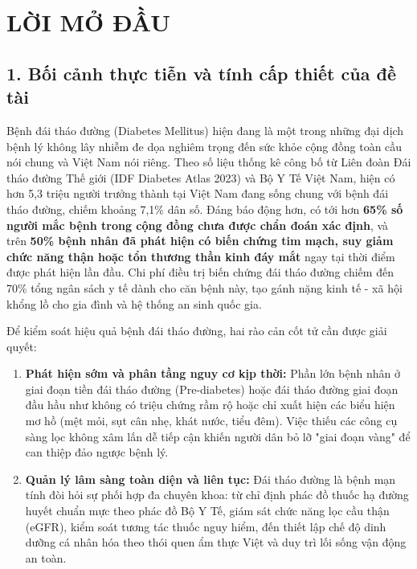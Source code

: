 \documentclass[12pt,a4paper]{article}
\begin{document}
\clearpage
{}
\tableofcontents
\clearpage
\listoffigures
\listoftables
\clearpage



\section*{LỜI MỞ ĐẦU}

\subsection*{1. Bối cảnh thực tiễn và tính cấp thiết của đề tài}
Bệnh đái tháo đường (Diabetes Mellitus) hiện đang là một trong những đại dịch bệnh lý không lây nhiễm đe dọa nghiêm trọng đến sức khỏe cộng đồng toàn cầu nói chung và Việt Nam nói riêng. Theo số liệu thống kê công bố từ Liên đoàn Đái tháo đường Thế giới (IDF Diabetes Atlas 2023) và Bộ Y Tế Việt Nam, hiện có hơn 5,3 triệu người trưởng thành tại Việt Nam đang sống chung với bệnh đái tháo đường, chiếm khoảng 7,1\% dân số. Đáng báo động hơn, có tới hơn \textbf{65\% số người mắc bệnh trong cộng đồng chưa được chẩn đoán xác định}, và trên \textbf{50\% bệnh nhân đã phát hiện có biến chứng tim mạch, suy giảm chức năng thận hoặc tổn thương thần kinh đáy mắt} ngay tại thời điểm được phát hiện lần đầu. Chi phí điều trị biến chứng đái tháo đường chiếm đến 70\% tổng ngân sách y tế dành cho căn bệnh này, tạo gánh nặng kinh tế - xã hội khổng lồ cho gia đình và hệ thống an sinh quốc gia.

Để kiểm soát hiệu quả bệnh đái tháo đường, hai rào cản cốt tử cần được giải quyết:
\begin{enumerate}[leftmargin=1.2cm]
    \item \textbf{Phát hiện sớm và phân tầng nguy cơ kịp thời:} Phần lớn bệnh nhân ở giai đoạn tiền đái tháo đường (Pre-diabetes) hoặc đái tháo đường giai đoạn đầu hầu như không có triệu chứng rầm rộ hoặc chỉ xuất hiện các biểu hiện mơ hồ (mệt mỏi, sụt cân nhẹ, khát nước, tiểu đêm). Việc thiếu các công cụ sàng lọc không xâm lấn dễ tiếp cận khiến người dân bỏ lỡ "giai đoạn vàng" để can thiệp đảo ngược bệnh lý.
    \item \textbf{Quản lý lâm sàng toàn diện và liên tục:} Đái tháo đường là bệnh mạn tính đòi hỏi sự phối hợp đa chuyên khoa: từ chỉ định phác đồ thuốc hạ đường huyết chuẩn mực theo phác đồ Bộ Y Tế, giám sát chức năng lọc cầu thận (eGFR), kiểm soát tương tác thuốc nguy hiểm, đến thiết lập chế độ dinh dưỡng cá nhân hóa theo thói quen ẩm thực Việt và duy trì lối sống vận động an toàn.
\end{enumerate}
\end{document}

